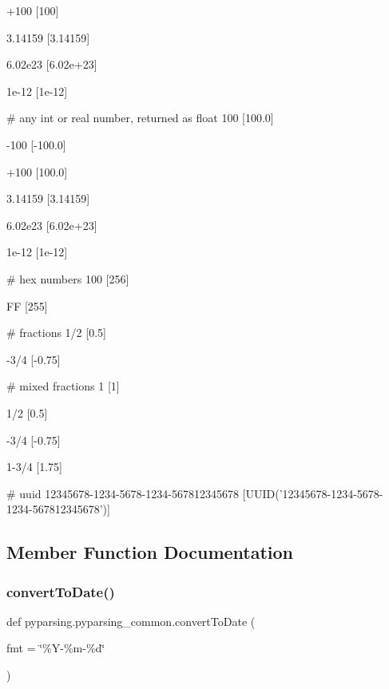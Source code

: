 \begin{DoxyVerb}
    +100
    [100]

    3.14159
    [3.14159]

    6.02e23
    [6.02e+23]

    1e-12
    [1e-12]

    # any int or real number, returned as float
    100
    [100.0]

    -100
    [-100.0]

    +100
    [100.0]

    3.14159
    [3.14159]

    6.02e23
    [6.02e+23]

    1e-12
    [1e-12]

    # hex numbers
    100
    [256]

    FF
    [255]

    # fractions
    1/2
    [0.5]

    -3/4
    [-0.75]

    # mixed fractions
    1
    [1]

    1/2
    [0.5]

    -3/4
    [-0.75]

    1-3/4
    [1.75]

    # uuid
    12345678-1234-5678-1234-567812345678
    [UUID('12345678-1234-5678-1234-567812345678')]
\end{DoxyVerb}
 

\subsection{Member Function Documentation}
\mbox{\label{classpyparsing_1_1pyparsing__common_abbfb7a4271749ae7b2bd5d52e0d878ca}} 
\subsubsection{\texorpdfstring{convert\+To\+Date()}{convertToDate()}}
{\footnotesize\ttfamily def pyparsing.\+pyparsing\+\_\+common.\+convert\+To\+Date (\begin{DoxyParamCaption}\item[{}]{fmt = {\ttfamily \char`\"{}\%Y-\/\%m-\/\%d\char`\"{}} }\end{DoxyParamCaption})\hspace{0.3cm}{\ttfamily [static]}}

